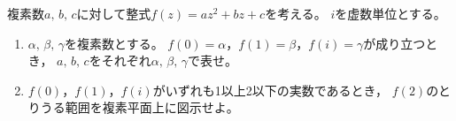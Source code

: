 \documentclass[../../main.tex]{subfiles}
\begin{document}
複素数$a, \, b, \, c$に対して整式$f(z)=az^2+bz+c$を考える。
$i$を虚数単位とする。
\begin{enumerate}
  \item$\alpha, \, \beta, \, \gamma$を複素数とする。
    $f(0)=\alpha$，$f(1)=\beta$，$f(i)=\gamma$が成り立つとき，
    $a, \, b, \, c$をそれぞれ$\alpha, \, \beta, \, \gamma$で表せ。
  \item$f(0)$，$f(1)$，$f(i)$がいずれも1以上2以下の実数であるとき，
    $f(2)$のとりうる範囲を複素平面上に図示せよ。
\end{enumerate}
\end{document}
